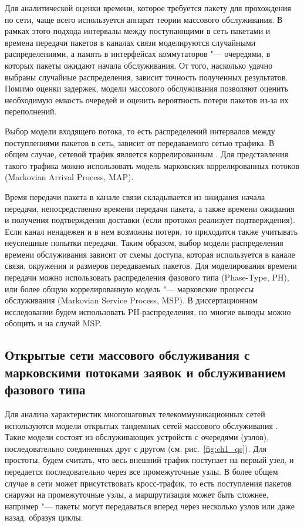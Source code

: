 Для аналитической оценки времени, которое требуется пакету для прохождения по сети, чаще всего используется аппарат теории массового обслуживания. В рамках этого подхода интервалы между поступающими в сеть пакетами и времена передачи пакетов в каналах связи моделируются случайными распределениями, а память в интерфейсах коммутаторов "--- очередями, в которых пакеты ожидают начала обслуживания. От того, насколько удачно выбраны случайные распределения, зависит точность полученных результатов. Помимо оценки задержек, модели массового обслуживания позволяют оценить необходимую емкость очередей и оценить вероятность потери пакетов из-за их переполнений.

Выбор модели входящего потока, то есть распределений интервалов между поступлениями пакетов в сеть, зависит от передаваемого сетью трафика. В общем случае, сетевой трафик является коррелированным \cite{Heyman2003, Klemm2003}. Для представления такого трафика можно использовать модель марковских коррелированных потоков (Markovian Arrival Process, MAP).

Время передачи пакета в канале связи складывается из ожидания начала передачи, непосредственно времени передачи пакета, а также времени ожидания и получения подтверждения доставки (если протокол реализует подтверждения). Если канал ненадежен и в нем возможны потери, то приходится также учитывать неуспешные попытки передачи. Таким образом, выбор модели распределения времени обслуживания зависит от схемы доступа, которая используется в канале связи, окружения и размеров передаваемых пакетов. Для моделирования времени передачи можно использовать распределения фазового типа (Phase-Type, PH), или более общую коррелированную модель "--- марковские процессы обслуживания (Markovian Service Process, MSP). В диссертационном исследовании будем использовать PH-распределения, но многие выводы можно обощить и на случай MSP.


\subsection{Открытые сети массового обслуживания с марковскими потоками заявок и обслуживанием фазового типа}
\label{sec:ch1_qs_map_ph}

Для анализа характеристик многошаговых телекоммуникационных сетей используются модели открытых тандемных сетей массового обслуживания \cite{Vishnevskii2017, VishnevskyDudin2018}. Такие модели состоят из обслуживающих устройств с очередями (узлов), последовательно соединенных друг с другом (см. рис.~\ref{fig:ch1_qs}). Для простоты, будем считать, что весь внешний трафик поступает на первый узел, и передается последовательно через все промежуточные узлы. В более общем случае в сети может присутствовать кросс-трафик, то есть поступления пакетов снаружи на промежуточные узлы, а маршрутизация может быть сложнее, например "--- пакеты могут передаваться вперед через несколько узлов или даже назад, образуя циклы.

